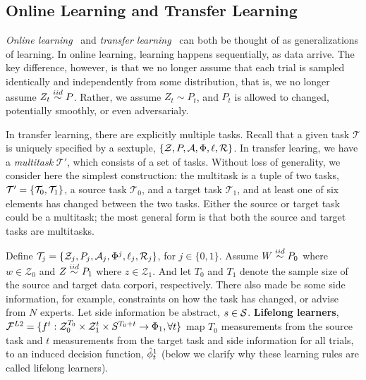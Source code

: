 \documentclass{article}
\begin{document}
\subsection{Online Learning and Transfer Learning}

\emph{Online learning}~\cite{Mohri2012} and \emph{transfer learning}~\cite{Pan2010} can both be thought of as generalizations of learning.  In online learning, learning happens sequentially, as data arrive.  The key difference, however, is that we no longer assume that each trial is sampled identically and independently from some distribution, that is, we no longer assume $Z_t \overset{iid}{\sim} P$.  Rather, we assume $Z_t \sim P_t$, and $P_t$ is allowed to changed, potentially smoothly, or even adversarialy.  

In transfer learning, there are explicitly multiple tasks. 
Recall that a given task $\mathcal{T}$ is uniquely specified by a sextuple, $\{\mathcal{Z}, P, \mathcal{A}, \Phi, \ell, \mathcal{R}\}$.  In transfer learing, we have a \emph{multitask} $\mathcal{T}'$, which  consists of a set of tasks.  Without loss of generality, we consider here the simplest construction: the multitask is a tuple of two tasks, $\mathcal{T}'=\{\mathcal{T}_0, \mathcal{T}_1\}$,  a source task $\mathcal{T}_0$, and a target task $\mathcal{T}_1$, and at least one of six elements has changed between the two tasks.  Either the source or target task could be a multitask; the most general form is that both the source and target tasks are multitasks. 


Define $\mathcal{T}_j=\{\mathcal{Z}_j, P_j, \mathcal{A}_j, \Phi^j, \ell_j, \mathcal{R}_j\}$, for $j \in \{0,1\}$.  Assume  $W \overset{iid}{\sim} P_0$ where $w \in \mathcal{Z}_0$ and 
$Z \overset{iid}{\sim} P_1$ where $z \in \mathcal{Z}_1$.  
And let $T_0$ and $T_1$ denote the sample size of the source and target data corpori, respectively. 
There also made be some side information, for example, constraints on how the task has changed, or advise from $N$ experts. Let side information be abstract, $s \in \mathcal{S}$. \textbf{Lifelong learners}, $\mathcal{F}^{L2}=\{ f^t: \mathcal{Z}_0^{T_0} \times \mathcal{Z}_1^t \times {S}^{T_0+t} \to \Phi_1, \forall t\}$ map $T_0$ measurements from the source task and $t$ measurements from the target task and side information for all trials,  to an induced decision function, $\hat{\phi}_t^1$ (below we clarify why these learning rules are called lifelong learners). 
\end{document}
